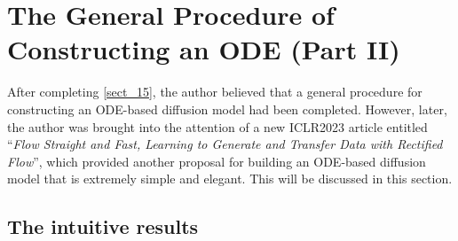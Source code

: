 \section{The General Procedure of Constructing an ODE (Part II)}

After completing \cref{sect_15}, the author believed that a general procedure for constructing an ODE-based diffusion model had been completed. However, later, the author was brought into the attention of a new ICLR2023 article entitled ``\emph{Flow Straight and Fast, Learning to Generate and Transfer Data with Rectified Flow}''\cite{liu2022flow}, which provided another proposal for building an ODE-based diffusion model that is extremely simple and elegant. This will be discussed in this section.

\subsection{The intuitive results}

